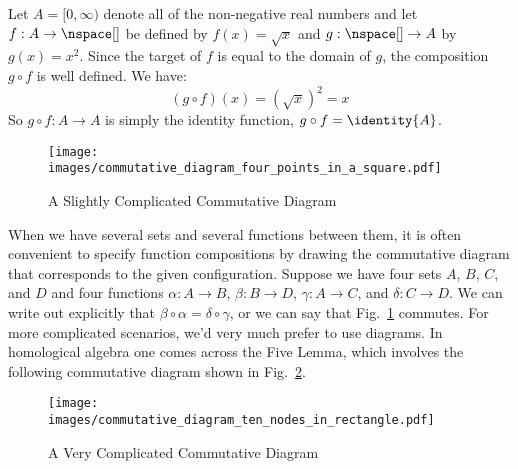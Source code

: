         \begin{example}
            Let $A=[0,\infty)$ denote all of the non-negative real numbers and
            let $f:A\rightarrow\nspace[]$ be defined by $f(x)=\sqrt{x}$ and
            $g:\nspace[]\rightarrow{A}$ by $g(x)=x^{2}$. Since the target of $f$
            is equal to the domain of $g$, the composition $g\circ{f}$ is well
            defined. We have:
            \begin{equation}
                (g\circ{f})(x)=(\sqrt{x})^{2}=x
            \end{equation}
            So $g\circ{f}:A\rightarrow{A}$ is simply the identity function,
            $g\circ{f}=\identity{A}$.
        \end{example}
        \begin{minipage}[t]{0.35\textwidth}
            \begin{figure}[H]
                \centering
                \captionsetup{type=figure}
                \texttt{[image: images/commutative\_diagram\_four\_points\_in\_a\_square.pdf]}
                \caption{A Slightly Complicated Commutative Diagram}
                \label{fig:Commutative_Diagram_Func_Comp_002}
            \end{figure}
        \end{minipage}
        \hfill
        \begin{minipage}[t]{0.60\textwidth}
            When we have several sets and several functions between them, it is
            often convenient to specify function compositions by drawing the
            commutative diagram that corresponds to the given configuration.
            Suppose we have four sets $A$, $B$, $C$, and $D$ and four functions
            $\alpha:A\rightarrow{B}$, $\beta:B\rightarrow{D}$,
            $\gamma:A\rightarrow{C}$, and $\delta:C\rightarrow{D}$. We can write out
            explicitly that $\beta\circ\alpha=\delta\circ\gamma$, or we can say that
            Fig.~\ref{fig:Commutative_Diagram_Func_Comp_002} commutes. For more
            complicated scenarios, we'd very much prefer to use diagrams. In
            homological algebra one comes across the Five
            Lemma, which involves the following
            commutative diagram shown in
            Fig.~\ref{fig:Commutative_Diagram_Func_Comp_003}.
        \end{minipage}
        \begin{figure}[H]
            \centering
            \captionsetup{type=figure}
            \texttt{[image: images/commutative\_diagram\_ten\_nodes\_in\_rectangle.pdf]}
            \caption{A Very Complicated Commutative Diagram}
            \label{fig:Commutative_Diagram_Func_Comp_003}
        \end{figure}
